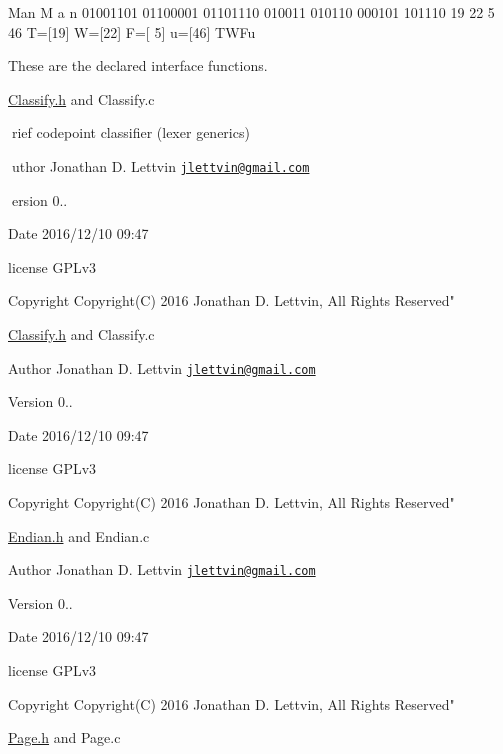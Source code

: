Man M a n 01001101 01100001 01101110 010011 010110 000101 101110 19 22 5 46 T=\mbox{[}19\mbox{]} W=\mbox{[}22\mbox{]} F=\mbox{[} 5\mbox{]} u=\mbox{[}46\mbox{]} T\+W\+Fu

These are the declared interface functions.

\hyperlink{_classify_8h_source}{Classify.\+h} and Classify.\+c

rief codepoint classifier (lexer generics)

uthor Jonathan D. Lettvin \href{mailto:jlettvin@gmail.com}{\tt jlettvin@gmail.\+com}

ersion 0..

\begin{DoxyDate}{Date}
2016/12/10 09\+:47
\end{DoxyDate}
license G\+P\+Lv3

\begin{DoxyCopyright}{Copyright}
Copyright(\+C) 2016 Jonathan D. Lettvin, All Rights Reserved"
\end{DoxyCopyright}
\hyperlink{_classify_8h_source}{Classify.\+h} and Classify.\+c

\begin{DoxyAuthor}{Author}
Jonathan D. Lettvin \href{mailto:jlettvin@gmail.com}{\tt jlettvin@gmail.\+com}
\end{DoxyAuthor}
\begin{DoxyVersion}{Version}
0..
\end{DoxyVersion}
\begin{DoxyDate}{Date}
2016/12/10 09\+:47
\end{DoxyDate}
license G\+P\+Lv3

\begin{DoxyCopyright}{Copyright}
Copyright(\+C) 2016 Jonathan D. Lettvin, All Rights Reserved"
\end{DoxyCopyright}
\hyperlink{_endian_8h_source}{Endian.\+h} and Endian.\+c

\begin{DoxyAuthor}{Author}
Jonathan D. Lettvin \href{mailto:jlettvin@gmail.com}{\tt jlettvin@gmail.\+com}
\end{DoxyAuthor}
\begin{DoxyVersion}{Version}
0..
\end{DoxyVersion}
\begin{DoxyDate}{Date}
2016/12/10 09\+:47
\end{DoxyDate}
license G\+P\+Lv3

\begin{DoxyCopyright}{Copyright}
Copyright(\+C) 2016 Jonathan D. Lettvin, All Rights Reserved"
\end{DoxyCopyright}
\hyperlink{_page_8h_source}{Page.\+h} and Page.\+c


